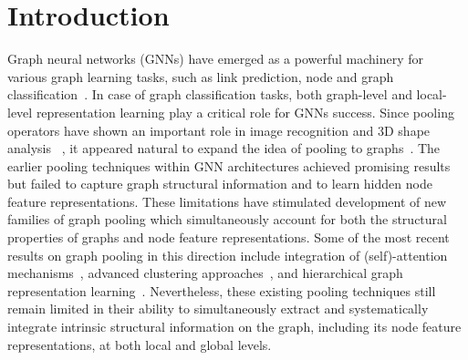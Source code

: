 \documentclass[letterpaper]{article} %
\begin{document}
\section{Introduction}
Graph neural networks (GNNs) have emerged as a powerful machinery for various graph learning tasks, 
such as link prediction, node and graph classification~\cite{zhou2020graph, xia2021graph}. 
In case of graph classification tasks, both graph-level and local-level %
representation learning play a critical role for GNNs success. Since pooling operators have shown an important role in image recognition and 3D shape analysis%
~\cite{boureau2010theoretical,shen2018mining}, it appeared natural to expand the idea of pooling to graphs~\cite{yu2016multi,defferrard2016convolutional}. The earlier pooling techniques within GNN architectures achieved promising results but failed to capture graph structural information and to learn hidden node feature representations. These limitations have stimulated development of new families of graph pooling which simultaneously   
account for both the structural properties of graphs and node feature representations. Some of the most recent results on graph pooling in this direction include integration of (self)-attention mechanisms~\cite{huang2019attpool,lee2019self}, advanced clustering approaches~\cite{bianchi2020spectral,wang2020haar,bodnar2021deep}, and hierarchical graph representation learning~\cite{yang2021hierarchical}.   
Nevertheless, these existing pooling techniques still remain limited in their ability to simultaneously extract and systematically integrate intrinsic structural information on the graph, including its node feature representations, at both local and global levels. 
\end{document}
